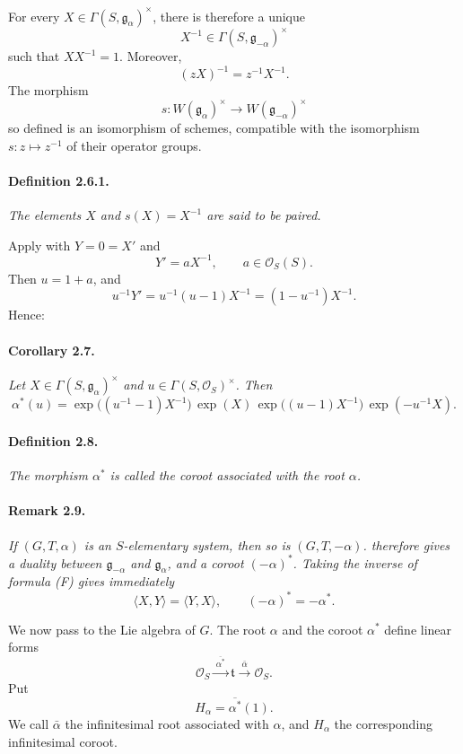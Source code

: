 For every \(X\in\Gamma(S,\mathfrak g_\alpha)^\times\), there is
therefore a unique
\[
  X^{-1}\in\Gamma(S,\mathfrak g_{-\alpha})^\times
\]
such that \(XX^{-1}=1\). Moreover,
\[
  (zX)^{-1}=z^{-1}X^{-1}.
\]
The morphism
\[
  s\colon W(\mathfrak g_\alpha)^\times
    \longrightarrow W(\mathfrak g_{-\alpha})^\times
\]
so defined is an isomorphism of schemes, compatible with the
isomorphism \(s\colon z\mapsto z^{-1}\) of their operator groups.

\paragraph{\textbf{Definition 2.6.1.}}
\emph{The elements \(X\) and \(s(X)=X^{-1}\) are said to be
paired.}

Apply  with \(Y=0=X'\) and
\[
  Y'=aX^{-1},\qquad a\in\mathscr O_S(S).
\]
Then \(u=1+a\), and
\[
  u^{-1}Y'
   =u^{-1}(u-1)X^{-1}
   =(1-u^{-1})X^{-1}.
\]
Hence:

\paragraph{\textbf{Corollary 2.7.}}
\emph{Let \(X\in\Gamma(S,\mathfrak g_\alpha)^\times\) and
\(u\in\Gamma(S,\mathscr O_S)^\times\). Then}
\[
  \alpha^\ast(u)
   =\exp\bigl((u^{-1}-1)X^{-1}\bigr)\,
      \exp(X)\,
      \exp\bigl((u-1)X^{-1}\bigr)\,
      \exp(-u^{-1}X).
\]

\paragraph{\textbf{Definition 2.8.}}
\emph{The morphism \(\alpha^\ast\) is called the coroot associated
with the root \(\alpha\).}

\paragraph{\textbf{Remark 2.9.}}
\emph{If \((G,T,\alpha)\) is an \(S\)-elementary system, then so
is \((G,T,-\alpha)\).  therefore gives a duality
between \(\mathfrak g_{-\alpha}\) and \(\mathfrak g_\alpha\), and
a coroot \((-\alpha)^\ast\). Taking the inverse of formula
\textup{(F)} gives immediately}
\[
  \langle X,Y\rangle=\langle Y,X\rangle,
  \qquad
  (-\alpha)^\ast=-\alpha^\ast.
\]

We now pass to the Lie algebra of \(G\). The root \(\alpha\) and
the coroot \(\alpha^\ast\) define linear forms
\[
  \mathscr O_S\xrightarrow{\ \overline{\alpha^\ast}\ }
    \mathfrak t\xrightarrow{\ \bar\alpha\ }\mathscr O_S.
\]
Put
\[
  H_\alpha=\overline{\alpha^\ast}(1).
\]
We call \(\bar\alpha\) the infinitesimal root associated with
\(\alpha\), and \(H_\alpha\) the corresponding infinitesimal
coroot.


